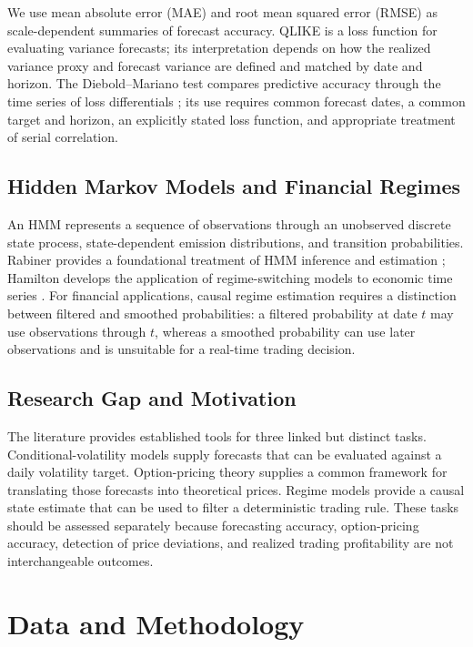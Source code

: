 \documentclass[journal]{IEEEtran}
\begin{document}
We use mean absolute error (MAE) and root mean squared error (RMSE) as scale-dependent summaries of forecast accuracy. QLIKE is a loss function for evaluating variance forecasts; its interpretation depends on how the realized variance proxy and forecast variance are defined and matched by date and horizon. The Diebold--Mariano test compares predictive accuracy through the time series of loss differentials \cite{diebold_mariano}; its use requires common forecast dates, a common target and horizon, an explicitly stated loss function, and appropriate treatment of serial correlation.

\subsection{Hidden Markov Models and Financial Regimes}

An HMM represents a sequence of observations through an unobserved discrete state process, state-dependent emission distributions, and transition probabilities. Rabiner provides a foundational treatment of HMM inference and estimation \cite{rabiner1989}; Hamilton develops the application of regime-switching models to economic time series \cite{hamilton1994}. For financial applications, causal regime estimation requires a distinction between filtered and smoothed probabilities: a filtered probability at date $t$ may use observations through $t$, whereas a smoothed probability can use later observations and is unsuitable for a real-time trading decision.

\subsection{Research Gap and Motivation}

The literature provides established tools for three linked but distinct tasks. Conditional-volatility models supply forecasts that can be evaluated against a daily volatility target. Option-pricing theory supplies a common framework for translating those forecasts into theoretical prices. Regime models provide a causal state estimate that can be used to filter a deterministic trading rule. These tasks should be assessed separately because forecasting accuracy, option-pricing accuracy, detection of price deviations, and realized trading profitability are not interchangeable outcomes.

\section{Data and Methodology}
\end{document}
